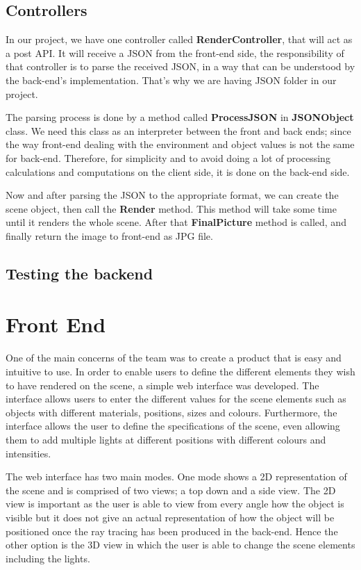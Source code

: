 \documentclass[a4paper]{report}
\begin{document}
	\subsection{Controllers}
	In our project, we have one controller called \textbf{RenderController}, that will act as a post API. It will receive a JSON from the front-end side, the responsibility of that controller is to parse the received JSON, in a way that can be understood by the back-end's implementation. That's why we are having JSON folder in our project.\\
	\par The parsing process is done by a method called \textbf{ProcessJSON} in \textbf{JSONObject} class. We need this class as an interpreter between the front and back ends; since the way front-end dealing with the environment and object values is not the same for back-end. Therefore, for simplicity and to avoid doing a lot of processing calculations and computations on the client side, it is done on the back-end side.
	\par Now and after parsing the JSON to the appropriate format, we can create the scene object, then call the \textbf{Render} method. This method will take some time until it renders the whole scene. After that \textbf{FinalPicture} method is called, and finally return the image to front-end as JPG file.
	\subsection{Testing the backend}
	
	\section{Front End}
	
	One of the main concerns of the team was to create a product that is easy and intuitive to use. In order to enable users to define the different elements they wish to have rendered on the scene, a simple web interface was developed. The interface allows users to enter the different values for the scene elements such as objects with different materials, positions, sizes and colours. Furthermore, the interface allows the user to define the specifications of the scene, even allowing them to add multiple lights at different positions with different colours and intensities. 
	
	\par The web interface has two main modes. One mode shows a 2D representation of the scene and is comprised of two views; a top down and a side view. The 2D view is important as the user is able to view from every angle how the object is visible but it does not give an actual representation of how the object will be positioned once the ray tracing has been produced in the back-end. Hence the other option is the 3D view in which the user is able to change the scene elements including the lights. 
	
\end{document}
